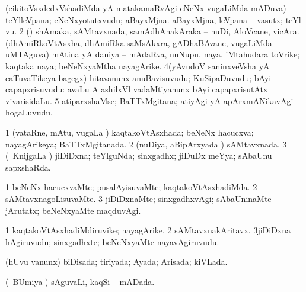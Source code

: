 {\bentry
{}
\gl{\saMkiSx}
\expl{}
\bmng
\emng
\eentry

\bentry
{}
\gl{\saMkiSx}
\expl{}
\bmng
\emng
\eentry

\bentry
{} 
\gl{\nA}
\expl{}
\bmng
\bnum
{} 
\banum
{} (cikitoVsxdedxVshadiMda yA matakamaRvAgi eNeNx \mo vugaLiMda mADuva) teYlleVpana; eNeNxyotutxvudu; aBayxMjna. 
 aBayxMjna, leVpana -- vasutx; teYl \mo vu. 
\eanum
\numie
\num{2} (\rUpa) shAmaka, sAMtavxnada, samAdhAnakAraka -- nuDi, AloVcane, vicAra. 
\banum
{}(dhAmiRkoVtAsxha, dhAmiRka saMsAkxra, gADhaBAvane, \mo vugaLiMda uMTAguva) mAtina yA daniya -- mAdaRva, nuNupu, naya. 
 iMtahudara toVrike; kaqtaka naya; beNeNxyaMtha nayagArike. 
\eanum
\numie
\num{4}(yAvudoV saninxveVsha yA caTuvaTikeya bagegx) hitavanunx anuBavisuvudu; KuSipaDuvudu; bAyi capapxrisuvudu:  avaLu A ashilxVl vadaMtiyanunx bAyi capapxrisutAtx vivarisidaLu. 
\num{5} atiparxshaMse; BaTTxMgitana; atiyAgi yA apArxmANikavAgi hogaLuvudu. 
\enum
\emng
\eentry

\bentry
{} 
\gl{\gu}
\expl{}
\bmng
\bnum
\num{1} (vataRne, mAtu, \mo vugaLa \vi) kaqtakoVtAsxhada; beNeNx hacucxva; nayagArikeya; BaTTxMgitanada. 
\num{2} (nuDiya, aBipArxyada \vi) sAMtavxnada. 
\num{3} (\kanmu\ KnijgaLa \vi) jiDiDxna; teYlguNda; sinxgadhx; jiDuDx meYya; sAbaUnu sapxshaRda. 
\enum
\emng
\eentry

\bentry
{} 
\gl{\kirxvi}
\expl{}
\bmng
\bnum
\num{1} beNeNx hacucxvaMte; pusalAyisuvaMte; kaqtakoVtAsxhadiMda. 
\num{2} sAMtavxnagoLisuvaMte. 
\num{3} jiDiDxnaMte; sinxgadhxvAgi; sAbaUninaMte jArutatx; beNeNxyaMte maqduvAgi. 
\enum
\emng
\eentry

\bentry
{} 
\gl{\nA}
\expl{}
\bmng
\bnum
\num{1} kaqtakoVtAsxhadiMdiruvike; nayagArike. 
\num{2} sAMtavxnakAritavx. 
\num{3}jiDiDxna hAgiruvudu; sinxgadhxte; beNeNxyaMte nayavAgiruvudu. 
\enum
\emng
\eentry

\bentry
{} 
\gl{\gu}
\expl{}
\bmng
 (hUvu \mo vanunx) biDisada; tiriyada; Ayada; Arisada; kiVLada. 
\emng
\eentry

\bentry
{} 
\gl{\gu}
\expl{}
\bmng
 (\kanmu\ BUmiya \vi) sAguvaLi, kaqSi -- mADada. 
\emng
\eentry

}
